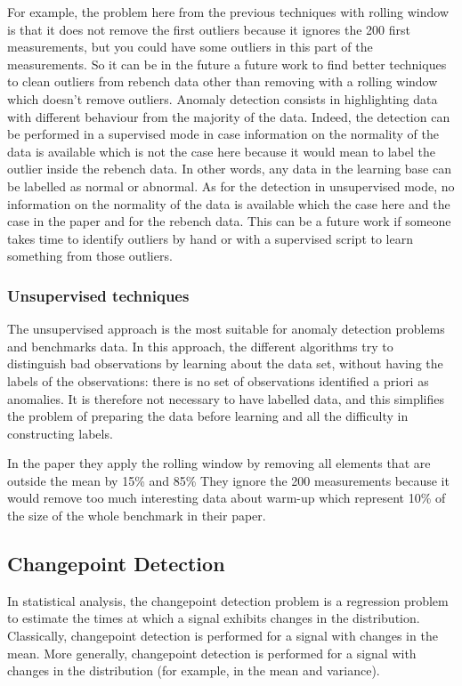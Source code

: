 \documentclass{article}
\begin{document}
For example, the problem here from the previous techniques with rolling window is that it does not remove the first outliers because it ignores the 200 first measurements, but you could have some outliers in this part of the measurements. So it can be in the future a future work to find better techniques to clean outliers from rebench data other than removing with a rolling window which doesn't remove outliers.
Anomaly detection consists in highlighting data with different behaviour from the majority of the data. 
Indeed, the detection can be performed in a supervised mode in case information on the normality of the data is available which is not the case here because it would mean to label the outlier inside the rebench data. In other words, any data in the learning base can be labelled as normal or abnormal.
As for the detection in unsupervised mode, no information on the normality of the data is available which the case here and the case in the \citep{barrett2017virtual} paper and for the rebench data. This can be a future work if someone takes time to identify outliers by hand or with a supervised script to learn something from those outliers.

\subsubsection{Unsupervised techniques}
The unsupervised approach is the most suitable for anomaly detection problems and benchmarks data. In this approach, the different algorithms try to distinguish bad observations by learning about the data set, without having the labels of the observations: there is no set of observations identified a priori as anomalies. It is therefore not necessary to have labelled data, and this simplifies the problem of preparing the data before learning and all the difficulty in constructing labels.

In the paper they apply the rolling window by removing all elements that are outside the mean by 15\% and 85\% They ignore the 200 measurements because it would remove too much interesting data about warm-up which represent 10\% of the size of the whole benchmark in their paper.


\subsection{Changepoint Detection}
In statistical analysis,  the changepoint detection problem is a regression problem to estimate the times at which a signal exhibits changes in the distribution. Classically, changepoint detection is performed for a signal with changes in the mean. More generally, changepoint detection is performed for a signal with changes in the distribution (for example, in the mean and variance). \\
\end{document}
